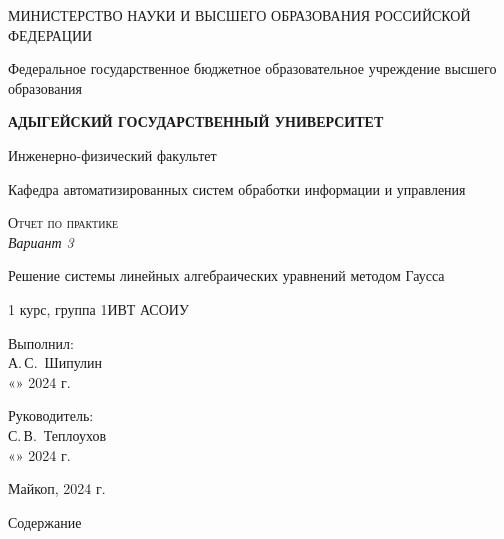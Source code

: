 \documentclass[12pt,a4paper]{scrartcl}
\begin{document}
	\begin{titlepage}
		\begin{center}
			\large
			МИНИСТЕРСТВО НАУКИ И ВЫСШЕГО ОБРАЗОВАНИЯ РОССИЙСКОЙ ФЕДЕРАЦИИ
			
			Федеральное государственное бюджетное образовательное учреждение высшего образования
			
			\textbf{АДЫГЕЙСКИЙ ГОСУДАРСТВЕННЫЙ УНИВЕРСИТЕТ}
			\vspace{0.25cm}
			
			Инженерно-физический факультет
			
			Кафедра автоматизированных систем обработки информации и управления
			\vfill

			\vfill
			
			\textsc{Отчет по практике}\\[5mm]
			
			\LARGE\textit{Вариант 3}
			
			{\LARGE Решение системы линейных алгебраических уравнений методом Гаусса}
			\bigskip
			
			1 курс, группа 1ИВТ АСОИУ
		\end{center}
		\vfill
		
		\newlength{\ML}
		\hfill\begin{minipage}{0.5\textwidth}
			Выполнил:\\
			\underline{\hspace{\ML}} А.\,С.~Шипулин\\
			«\underline{\hspace{0.7cm}}» \underline{\hspace{2cm}} 2024 г.
		\end{minipage}%
		\bigskip
		
		\hfill\begin{minipage}{0.5\textwidth}
			Руководитель:\\
			\underline{\hspace{\ML}} С.\,В.~Теплоухов\\
			«\underline{\hspace{0.7cm}}» \underline{\hspace{2cm}} 2024 г.
		\end{minipage}%
		
		
		\vfill
		
		
		
		\begin{center}
			
			Майкоп, 2024 г.
		\end{center}
	\end{titlepage}
\LARGE{Содержание}
\end{document}
